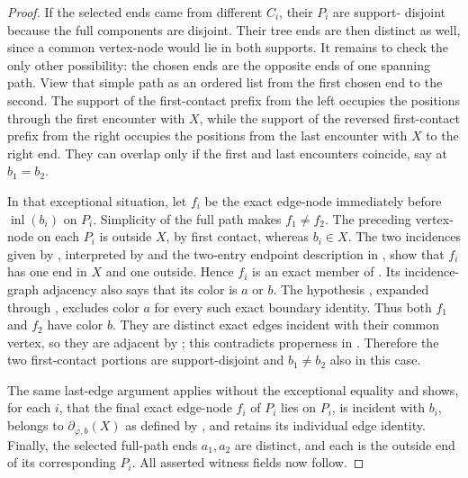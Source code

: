 \begin{proof}
If the selected ends came from different $C_i$, their $P_i$ are support-
disjoint because the full components are disjoint.  Their tree ends are
then distinct as well, since a common vertex-node would lie in both
supports.  It remains to check the only other possibility: the chosen
ends are the opposite ends of one spanning path.  View that simple path
as an ordered list from the first chosen end to the second.  The support
of the first-contact prefix from the left occupies the positions through
the first encounter with $X$, while the support of the reversed
first-contact prefix from the right occupies the positions from the last
encounter with $X$ to the right end.  They can overlap only if the first
and last encounters coincide, say at $b_1=b_2$.

In that exceptional situation, let $f_i$ be the exact edge-node immediately
before $\operatorname{inl}(b_i)$ on $P_i$.  Simplicity of the full path
makes $f_1\ne f_2$.  The preceding vertex-node on each $P_i$ is outside
$X$, by first contact, whereas $b_i\in X$.  The two incidences given by
, interpreted by  and
the two-entry endpoint description in , show
that $f_i$ has one end in $X$ and one outside.  Hence $f_i$ is an exact
member of .  Its incidence-graph adjacency also
says that its color is $a$ or $b$.  The hypothesis
, expanded through
, excludes color $a$ for every such exact
boundary identity.  Thus both $f_1$ and $f_2$ have color $b$.  They are
distinct exact edges incident with their common vertex, so they are
adjacent by ; this contradicts properness in
.  Therefore the two first-contact portions
are support-disjoint and $b_1\ne b_2$ also in this case.

The same last-edge argument applies without the exceptional equality and
shows, for each $i$, that the final exact edge-node $f_i$ of $P_i$ lies on
$P_i$, is incident with $b_i$, belongs to
$\partial_{\varphi,b}(X)$ as defined by
, and retains its individual edge identity.
Finally, the selected full-path ends $a_1,a_2$ are distinct, and each is
the outside end of its corresponding $P_i$.  All asserted witness fields
now follow.
\end{proof}
